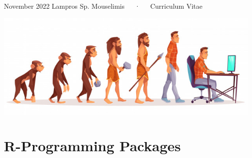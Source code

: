\documentclass[11pt, a4paper]{awesome-cv}
\begin{document}
\makecvheader

\makecvfooter
  {November 2022}
    {Lampros Sp. Mouselimis~~~·~~~Curriculum Vitae}
  {\thepage}





\includegraphics{human_evolution.jpg}

\hypertarget{r-programming-packages}{%
\section{R-Programming Packages}\label{r-programming-packages}}
\end{document}

